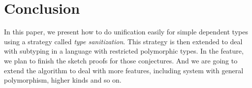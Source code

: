 \section{Conclusion}
\label{sec:conclusion}

In this paper, we present how to do unification easily for simple dependent types using
a strategy called \textit{type sanitization}. This strategy is then extended to
deal with subtyping in a language with restricted polymorphic types.
In the
feature, we plan to finish the sketch proofs for those conjectures. And we are
going to extend the algorithm to deal with more features, including system with
general polymorphism, higher kinds and so on.